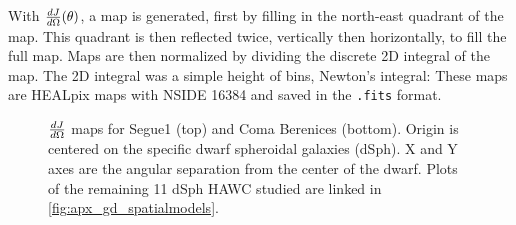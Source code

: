 With $\frac{dJ}{d\Omega}(\theta)$, a map is generated, first by filling in the north-east quadrant of the map.
This quadrant is then reflected twice, vertically then horizontally, to fill the full map.
Maps are then normalized by dividing the discrete 2D integral of the map.
The 2D integral was a simple height of bins, Newton's integral:
\newtonIntegral
These maps are HEALpix maps with NSIDE 16384 and saved in the \texttt{.fits} format.

\begin{figure}
    \caption{$\frac{dJ}{d\Omega}$ maps for Segue1 (top) and Coma Berenices (bottom). Origin is centered on the specific dwarf spheroidal galaxies (dSph). X and Y axes are the angular separation from the center of the dwarf. Plots of the remaining 11 dSph HAWC studied are linked in \cref{fig:apx_gd_spatialmodels}.}\label{fig:gd_spatialmodel}
\end{figure}


